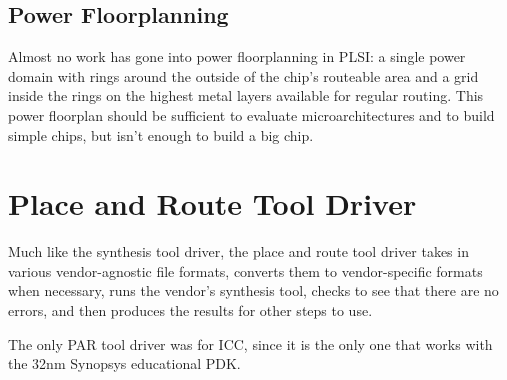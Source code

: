 \documentclass{article}
\begin{document}
\subsection{Power Floorplanning}

Almost no work has gone into power floorplanning in PLSI: a single
power domain with rings around the outside of the chip's routeable area and a
grid inside the rings on the highest metal layers available for regular
routing.  This power floorplan should be sufficient to evaluate
microarchitectures and to build simple chips, but isn't enough to build
a big chip.

\section{Place and Route Tool Driver}

Much like the synthesis tool driver, the place and route tool driver takes in
various vendor-agnostic file formats, converts them to vendor-specific formats
when necessary, runs the vendor's synthesis tool, checks to see that there are
no errors, and then produces the results for other steps to use.

The only PAR tool driver was for ICC, since it is the
only one that works with the 32nm Synopsys educational PDK.
\end{document}

